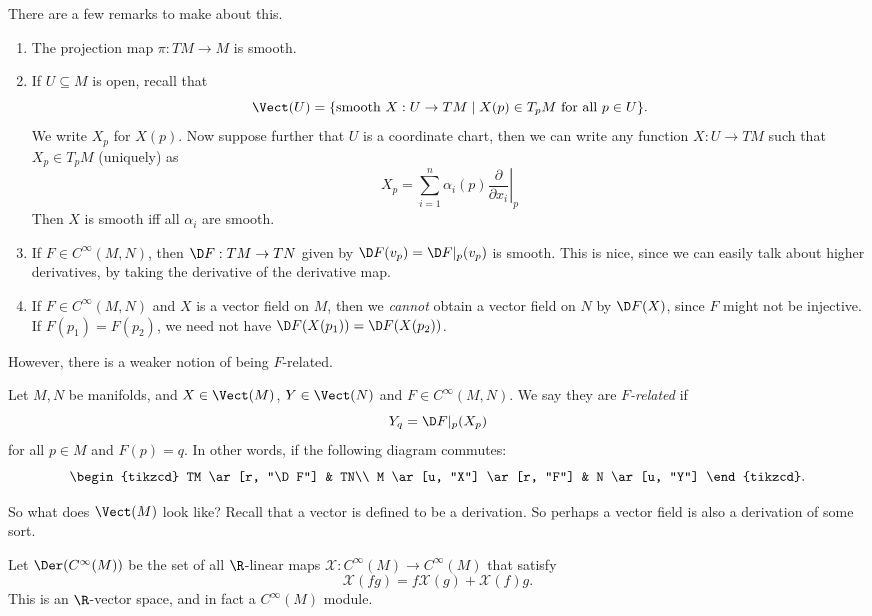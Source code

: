 \documentclass[a4paper]{article}
\begin{document}
There are a few remarks to make about this.
\begin{enumerate}
  \item The projection map $\pi: TM \to M$ is smooth.
  \item If $U \subseteq M$ is open, recall that
    \[
      \Vect(U) = \{\text{smooth }X: U \to TM\mid X(p) \in T_pM\text{ for all }p \in U\}.
    \]
    We write $X_p$ for $X(p)$. Now suppose further that $U$ is a coordinate chart, then we can write any function $X: U \to TM$ such that $X_p \in T_p M$ (uniquely) as
    \[
      X_p = \sum_{i = 1}^n \alpha_i(p) \left.\frac{\partial}{\partial x_i} \right|_p
    \]
    Then $X$ is smooth iff all $\alpha_i$ are smooth.
  \item If $F \in C^\infty(M, N)$, then $\D F: TM \to TN$ given by $\D F(v_p) = \D F|_p(v_p)$ is smooth. This is nice, since we can easily talk about higher derivatives, by taking the derivative of the derivative map.
  \item If $F \in C^\infty (M, N)$ and $X$ is a vector field on $M$, then we \emph{cannot} obtain a vector field on $N$ by $\D F(X)$, since $F$ might not be injective. If $F(p_1) = F(p_2)$, we need not have $\D F(X(p_1)) = \D F(X(p_2))$.
\end{enumerate}
However, there is a weaker notion of being $F$-related.
\begin{defi}[$F$-related]
  Let $M, N$ be manifolds, and $X \in \Vect(M)$, $Y \in \Vect(N)$ and $F \in C^\infty(M, N)$. We say they are \emph{$F$-related} if
  \[
    Y_q = \D F|_p (X_p)
  \]
  for all $p \in M$ and $F(p) = q$. In other words, if the following diagram commutes:
  \[
    \begin{tikzcd}
      TM \ar[r, "\D F"] & TN\\
      M \ar[u, "X"] \ar[r, "F"] & N \ar[u, "Y"]
    \end{tikzcd}.
  \]
\end{defi}

So what does $\Vect(M)$ look like? Recall that a vector is defined to be a derivation. So perhaps a vector field is also a derivation of some sort.
\begin{defi}
  Let $\Der(C^\infty(M))$ be the set of all $\R$-linear maps $\mathcal{X}: C^\infty(M) \to C^\infty(M)$ that satisfy
  \[
    \mathcal{X}(fg) = f \mathcal{X}(g) + \mathcal{X}(f) g.
  \]
  This is an $\R$-vector space, and in fact a $C^\infty(M)$ module.
\end{defi}
\end{document}
